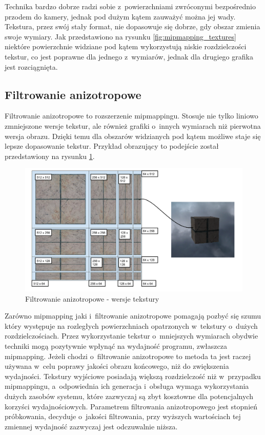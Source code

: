 \documentclass[a4paper,twoside,12pt]{book}
\begin{document}
Technika bardzo dobrze radzi sobie z~powierzchniami zwróconymi bezpośrednio przodem do kamery, jednak pod dużym kątem zauważyć można jej wady. Tekstura, przez swój stały format, nie dopasowuje się dobrze, gdy obszar zmienia swoje wymiary. Jak przedstawiono na rysunku \ref{fig:mipmapping_textures} niektóre powierzchnie widziane pod kątem wykorzystują niskie rozdzielczości tekstur, co jest poprawne dla jednego z~wymiarów, jednak dla drugiego grafika jest rozciągnięta.

\subsection{Filtrowanie anizotropowe}
Filtrowanie anizotropowe to rozszerzenie mipmappingu. Stosuje nie tylko liniowo zmniejszone wersje tekstur, ale również grafiki o~innych wymiarach niż pierwotna wersja obrazu. Dzięki temu dla obszarów widzianych pod kątem możliwe staje się lepsze dopasowanie tekstur. Przykład obrazujący to podejście został przedstawiony na rysunku \ref{fig:anisotropy_textures}.

\begin{figure}[H]
    \centering
    \includegraphics[width=\textwidth]{res/anisotropy_textures.png}
    \caption{Filtrowanie anizotropowe - wersje tekstury}
    \label{fig:anisotropy_textures}
\end{figure}

Zarówno mipmapping jaki i~filtrowanie anizotropowe pomagają pozbyć się szumu który występuje na rozległych powierzchniach opatrzonych w~tekstury o~dużych rozdzielczościach. Przez wykorzystanie tekstur o~mniejszych wymiarach obydwie techniki mogą pozytywnie wpłynąć na wydajność programu, zwłaszcza mipmapping. Jeżeli chodzi o~filtrowanie anizotropowe to metoda ta jest raczej używana w~celu poprawy jakości obrazu końcowego, niż do zwiększenia wydajności. Tekstury wyjściowe posiadają większą rozdzielczość niż w~przypadku mipmappingu, a~odpowiednia ich generacja i~obsługa wymaga wykorzystania dużych zasobów systemu, które zazwyczaj są zbyt kosztowne dla potencjalnych korzyści wydajnościowych. Parametrem filtrowania anizotropowego jest stopnień próbkowania, decyduje o~jakości filtrowania, przy wyższych wartościach tej zmiennej wydajność zazwyczaj jest odczuwalnie niższa. \cite{bib:superbible} \\
\end{document}
